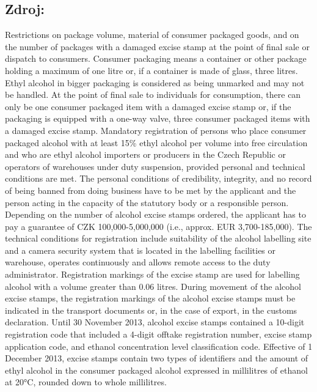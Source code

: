 \documentclass[10pt]{article}
\begin{document}
\subsection*{Zdroj:}

Restrictions on package volume, material of consumer packaged goods, and on the number of packages with a damaged excise stamp at the point of final sale or dispatch to consumers.
Consumer packaging means a container or other package holding a maximum of one litre or, if a container is made of glass, three litres.
Ethyl alcohol in bigger packaging is considered as being unmarked and may not be handled.
At the point of final sale to individuals for consumption, there can only be one consumer packaged item with a damaged excise stamp or, if the packaging is equipped with a one-way valve, three consumer packaged items with a damaged excise stamp.
Mandatory registration of persons who place consumer packaged alcohol with at least 15\% ethyl alcohol per volume into free circulation and who are ethyl alcohol importers or producers in the Czech Republic or operators of warehouses under duty suspension, provided personal and technical conditions are met.
The personal conditions of credibility, integrity, and no record of being banned from doing business have to be met by the applicant and the person acting in the capacity of the statutory body or a responsible person.
Depending on the number of alcohol excise stamps ordered, the applicant has to pay a guarantee of CZK 100,000-5,000,000 (i.e., approx. EUR 3,700-185,000).
The technical conditions for registration include suitability of the alcohol labelling site and a camera security system that is located in the labelling facilities or warehouse, operates continuously and allows remote access to the duty administrator.
Registration markings of the excise stamp are used for labelling alcohol with a volume greater than 0.06 litres.
During movement of the alcohol excise stamps, the registration markings of the alcohol excise stamps must be indicated in the transport documents or, in the case of export, in the customs declaration.
Until 30 November 2013, alcohol excise stamps contained a 10-digit registration code that included a 4-digit offtake registration number, excise stamp application code, and ethanol concentration level classification code.
Effective of 1 December 2013, excise stamps contain two types of identifiers and the amount of ethyl alcohol in the consumer packaged alcohol expressed in millilitres of ethanol at 20°C, rounded down to whole millilitres.
\end{document}
